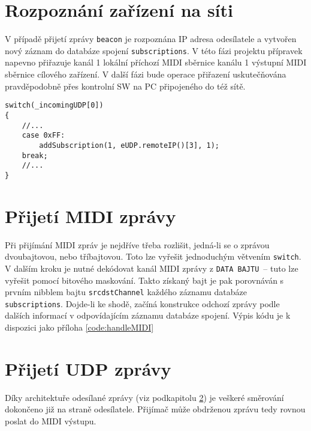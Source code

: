 \section{Rozpoznání zařízení na síti}
V případě přijetí zprávy \texttt{beacon} je rozpoznána IP adresa odesílatele a vytvořen nový záznam do databáze spojení \texttt{sub\-scrip\-tions}. V této fázi projektu přípravek napevno přiřazuje kanál 1  lokální příchozí \acs{MIDI} sběrnice kanálu 1 výstupní \acs{MIDI} sběrnice cílového zařízení. V další fázi bude operace přiřazení uskutečňována pravděpodobně přes kontrolní SW na PC připojeného do též sítě.

\begin{lstlisting}
switch(_incomingUDP[0])
{
    //...
    case 0xFF:
        addSubscription(1, eUDP.remoteIP()[3], 1);
    break;
    //...
}
\end{lstlisting}

\section{Přijetí \acs{MIDI} zprávy}\label{chpt:PrijMIDI}
Při přijímání \acs{MIDI} zpráv je nejdříve třeba rozlišit, jedná-li se o zprávou dvoubajtovou, nebo tříbajtovou. Toto lze vyřešit jednoduchým větvením \texttt{switch}. V dalším kroku je nutné dekódovat kanál \acs{MIDI} zprávy z \texttt{DATA BAJTU}~-- tuto  lze vyřešit pomocí bitového maskování. Takto získaný bajt je pak porovnáván s prvním nibblem bajtu \texttt{srcdstChannel} každého záznamu databáze \texttt{sub\-scrip\-tions}. Dojde-li ke shodě, začíná konstrukce odchozí zprávy podle dalších informací v odpovídajícím záznamu databáze spojení. Výpis kódu je k dispozici jako příloha \ref{code:handleMIDI}

\section{Přijetí UDP zprávy}
Díky architektuře odesílané zprávy (viz podkapitolu \ref{chpt:PrijMIDI}) je veškeré směrování dokončeno již na straně odesílatele. Přijímač může obdrženou zprávu tedy rovnou poslat do \acs{MIDI} výstupu.



